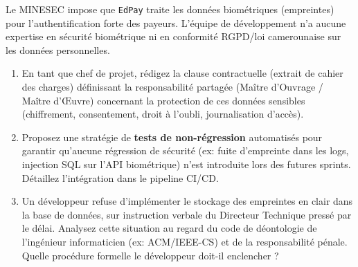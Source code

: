 \documentclass[11pt]{article}
\begin{document}
\begin{exercice}
Le MINESEC impose que \texttt{EdPay} traite les données biométriques (empreintes) pour l'authentification forte des payeurs. L'équipe de développement n'a aucune expertise en sécurité biométrique ni en conformité RGPD/loi camerounaise sur les données personnelles.
\begin{enumerate}
    \item [2 pts] En tant que chef de projet, rédigez la clause contractuelle (extrait de cahier des charges) définissant la responsabilité partagée (Maître d'Ouvrage / Maître d'Œuvre) concernant la protection de ces données sensibles (chiffrement, consentement, droit à l'oubli, journalisation d'accès).
    \item [2 pts] Proposez une stratégie de \textbf{tests de non-régression} automatisés pour garantir qu'aucune régression de sécurité (ex: fuite d'empreinte dans les logs, injection SQL sur l'API biométrique) n'est introduite lors des futures sprints. Détaillez l'intégration dans le pipeline CI/CD.
    \item [2 pts] Un développeur refuse d'implémenter le stockage des empreintes en clair dans la base de données, sur instruction verbale du Directeur Technique pressé par le délai. Analysez cette situation au regard du code de déontologie de l'ingénieur informaticien (ex: ACM/IEEE-CS) et de la responsabilité pénale. Quelle procédure formelle le développeur doit-il enclencher ?
\end{enumerate}
\end{exercice}
\end{document}
